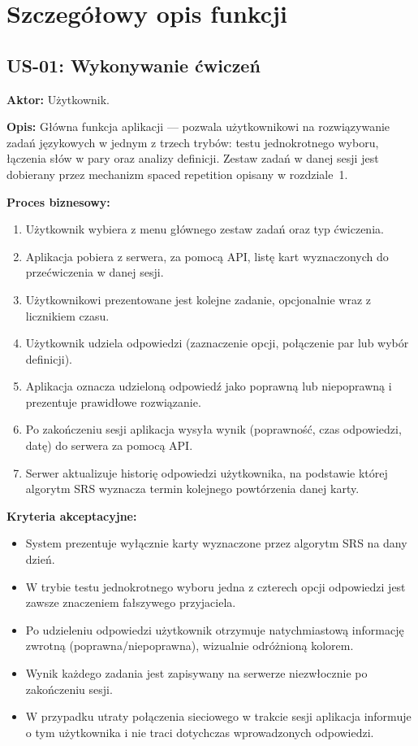 \documentclass[polish]{aghengthesis}
\begin{document}
\section{Szczegółowy opis funkcji}

\subsection{US-01: Wykonywanie ćwiczeń}
\textbf{Aktor:} Użytkownik.

\textbf{Opis:} Główna funkcja aplikacji — pozwala użytkownikowi na
rozwiązywanie zadań językowych w jednym z trzech trybów: testu jednokrotnego
wyboru, łączenia słów w pary oraz analizy definicji. Zestaw zadań w danej
sesji jest dobierany przez mechanizm spaced repetition opisany w rozdziale~1.

\textbf{Proces biznesowy:}
\begin{enumerate}
    \item Użytkownik wybiera z menu głównego zestaw zadań oraz typ ćwiczenia.
    \item Aplikacja pobiera z serwera, za pomocą API, listę kart wyznaczonych
    do przećwiczenia w danej sesji.
    \item Użytkownikowi prezentowane jest kolejne zadanie, opcjonalnie wraz
    z licznikiem czasu.
    \item Użytkownik udziela odpowiedzi (zaznaczenie opcji, połączenie par
    lub wybór definicji).
    \item Aplikacja oznacza udzieloną odpowiedź jako poprawną lub
    niepoprawną i prezentuje prawidłowe rozwiązanie.
    \item Po zakończeniu sesji aplikacja wysyła wynik (poprawność, czas
    odpowiedzi, datę) do serwera za pomocą API.
    \item Serwer aktualizuje historię odpowiedzi użytkownika, na podstawie
    której algorytm SRS wyznacza termin kolejnego powtórzenia danej karty.
\end{enumerate}

\textbf{Kryteria akceptacyjne:}
\begin{itemize}
    \item System prezentuje wyłącznie karty wyznaczone przez algorytm SRS
    na dany dzień.
    \item W trybie testu jednokrotnego wyboru jedna z czterech opcji
    odpowiedzi jest zawsze znaczeniem fałszywego przyjaciela.
    \item Po udzieleniu odpowiedzi użytkownik otrzymuje natychmiastową
    informację zwrotną (poprawna/niepoprawna), wizualnie odróżnioną kolorem.
    \item Wynik każdego zadania jest zapisywany na serwerze niezwłocznie po
    zakończeniu sesji.
    \item W przypadku utraty połączenia sieciowego w trakcie sesji aplikacja
    informuje o tym użytkownika i nie traci dotychczas wprowadzonych
    odpowiedzi.
\end{itemize}
\end{document}
